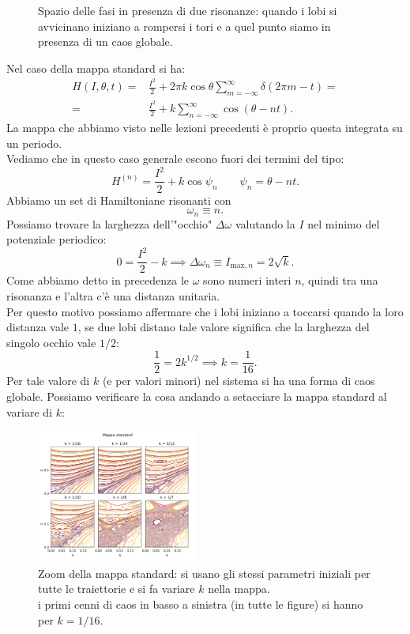 \begin{figure}[H]
    \centering
    \caption{\scriptsize Spazio delle fasi in presenza di due risonanze: quando i lobi si avvicinano iniziano a rompersi i tori e a quel punto siamo in presenza di un caos globale.}
    \label{fig:21_risonanze}
\end{figure}
\begin{exmp}
    Nel caso della mappa standard si ha:
    \[\begin{aligned}
	H(I, \theta, t) =& \frac{I^2}{2} + 2\pi k \cos\theta  \sum_{m = -\infty}^{\infty} \delta (2\pi m-t) = \\
	=& \frac{I^2}{2} + k \sum_{n= -\infty}^{\infty} \cos (\theta-nt)
    .\end{aligned}\]
    La mappa che abbiamo visto nelle lezioni precedenti è proprio questa integrata su un periodo.\\
    Vediamo che in questo caso generale escono fuori dei termini del tipo:
    \[
	H^{(n)}=\frac{I^2}{2}+k \cos\psi_n \qquad \psi_n = \theta-nt
    .\] 
    Abbiamo un set di Hamiltoniane risonanti con 
    \[
        \omega_n \equiv n
    .\] 
    Possiamo trovare la larghezza dell'"occhio" $\Delta\omega$ valutando la $I$ nel minimo del potenziale periodico:
    \[
        0 = \frac{I^2}{2}-k \implies  \Delta\omega_n \equiv I_{\text{max}, n} = 2\sqrt{k} 
    .\] 
    Come abbiamo detto in precedenza le $\omega$ sono numeri interi $n$, quindi tra una risonanza e l'altra c'è una distanza unitaria.\\
    Per questo motivo possiamo affermare che i lobi iniziano a toccarsi quando la loro distanza vale $1$, se due lobi distano tale valore significa che la larghezza del singolo occhio vale $1 /2$:
    \[
        \frac{1}{2} = 2k^{1 /2} \implies  k = \frac{1}{16}
    .\] 
    Per tale valore di $k$ (e per valori minori) nel sistema si ha una forma di caos globale. Possiamo verificare la cosa andando a setacciare la mappa standard al variare di $k$:
    \begin{figure}[H]
        \centering
	\includegraphics[width=0.47\textwidth]{figures/21_standard_maps.png}
        \caption{\scriptsize Zoom della mappa standard: si usano gli stessi parametri iniziali per tutte le traiettorie e si fa variare $k$ nella mappa.\\
	i primi cenni di caos in basso a sinistra (in tutte le figure) si hanno per $k = 1 / 16$.}
        \label{fig:figures-21_standard_maps-png}
    \end{figure}
\end{exmp}
